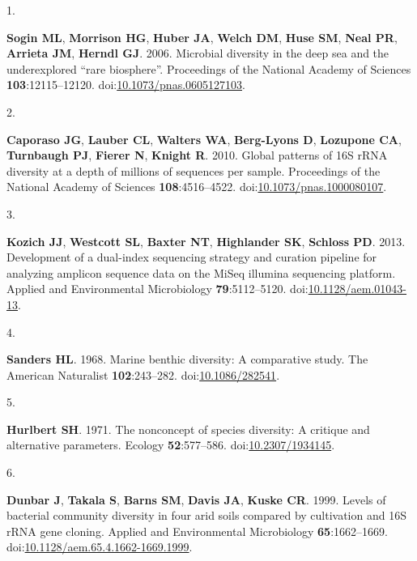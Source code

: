 \documentclass[
]{article}
\newlength{\cslhangindent}
\newlength{\csllabelwidth}
\newlength{\cslentryspacingunit} %
\newenvironment{CSLReferences}[2] %
 {%
  \setlength{\parindent}{0pt}
  \ifodd #1
  \let\oldpar\par
  \def\par{\hangindent=\cslhangindent\oldpar}
  \fi
  \setlength{\parskip}{#2\cslentryspacingunit}
 }%
 {}
\newcommand{\CSLLeftMargin}[1]{\parbox[t]{\csllabelwidth}{#1}}
\newcommand{\CSLRightInline}[1]{\parbox[t]{\linewidth - \csllabelwidth}{#1}\break}
\begin{document}
\hypertarget{refs}{}
\begin{CSLReferences}{0}{1}
\leavevmode{}%
\CSLLeftMargin{1. }%
\CSLRightInline{\textbf{Sogin ML}, \textbf{Morrison HG}, \textbf{Huber
JA}, \textbf{Welch DM}, \textbf{Huse SM}, \textbf{Neal PR},
\textbf{Arrieta JM}, \textbf{Herndl GJ}. 2006. Microbial diversity in
the deep sea and the underexplored {``}rare biosphere{''}. Proceedings
of the National Academy of Sciences \textbf{103}:12115--12120.
doi:\href{https://doi.org/10.1073/pnas.0605127103}{10.1073/pnas.0605127103}.}

\leavevmode{}%
\CSLLeftMargin{2. }%
\CSLRightInline{\textbf{Caporaso JG}, \textbf{Lauber CL},
\textbf{Walters WA}, \textbf{Berg-Lyons D}, \textbf{Lozupone CA},
\textbf{Turnbaugh PJ}, \textbf{Fierer N}, \textbf{Knight R}. 2010.
Global patterns of 16S {rRNA} diversity at a depth of millions of
sequences per sample. Proceedings of the National Academy of Sciences
\textbf{108}:4516--4522.
doi:\href{https://doi.org/10.1073/pnas.1000080107}{10.1073/pnas.1000080107}.}

\leavevmode{}%
\CSLLeftMargin{3. }%
\CSLRightInline{\textbf{Kozich JJ}, \textbf{Westcott SL}, \textbf{Baxter
NT}, \textbf{Highlander SK}, \textbf{Schloss PD}. 2013. Development of a
dual-index sequencing strategy and curation pipeline for analyzing
amplicon sequence data on the {MiSeq} illumina sequencing platform.
Applied and Environmental Microbiology \textbf{79}:5112--5120.
doi:\href{https://doi.org/10.1128/aem.01043-13}{10.1128/aem.01043-13}.}

\leavevmode{}%
\CSLLeftMargin{4. }%
\CSLRightInline{\textbf{Sanders HL}. 1968. Marine benthic diversity: A
comparative study. The American Naturalist \textbf{102}:243--282.
doi:\href{https://doi.org/10.1086/282541}{10.1086/282541}.}

\leavevmode{}%
\CSLLeftMargin{5. }%
\CSLRightInline{\textbf{Hurlbert SH}. 1971. The nonconcept of species
diversity: A critique and alternative parameters. Ecology
\textbf{52}:577--586.
doi:\href{https://doi.org/10.2307/1934145}{10.2307/1934145}.}

\leavevmode{}%
\CSLLeftMargin{6. }%
\CSLRightInline{\textbf{Dunbar J}, \textbf{Takala S}, \textbf{Barns SM},
\textbf{Davis JA}, \textbf{Kuske CR}. 1999. Levels of bacterial
community diversity in four arid soils compared by cultivation and 16S
{rRNA} gene cloning. Applied and Environmental Microbiology
\textbf{65}:1662--1669.
doi:\href{https://doi.org/10.1128/aem.65.4.1662-1669.1999}{10.1128/aem.65.4.1662-1669.1999}.}


\end{CSLReferences}
\end{document}
